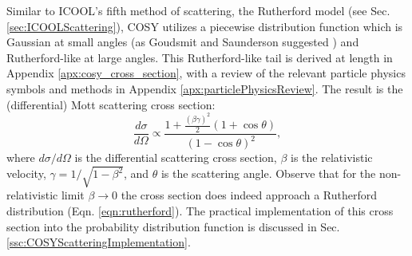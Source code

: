 %
%
 \label{sec:COSYScattering}\par
Similar to ICOOL's fifth method of scattering, the Rutherford model (see Sec. \ref{sec:ICOOLScattering}), COSY utilizes a piecewise distribution function which is Gaussian  at small angles (as Goudsmit and Saunderson suggested \cite{gs}) and Rutherford-like at large angles. This Rutherford-like tail is derived at length in Appendix \ref{apx:cosy_cross_section}, with a review of the relevant particle physics symbols and methods in Appendix \ref{apx:particlePhysicsReview}. The result is the (differential) Mott scattering cross section:
\begin{equation}\label{eqn:MottCrossSection}
\frac{d\sigma}{d\Omega} \propto \frac{1+\frac{(\beta\gamma)^2}{2} (1+\cos\theta)  }{(1-\cos\theta)^2},
\end{equation}
where $d\sigma/d\Omega$ is the differential scattering cross section, $\beta$ is the relativistic velocity, $\gamma=1/\sqrt{1-\beta^2}$, and $\theta$ is the scattering angle. Observe that for the non-relativistic limit $\beta\rightarrow 0$ the cross section does indeed approach a Rutherford distribution (Eqn. \ref{eqn:rutherford}). The practical implementation of this cross section into the probability distribution function is discussed in Sec. \ref{ssc:COSYScatteringImplementation}.

